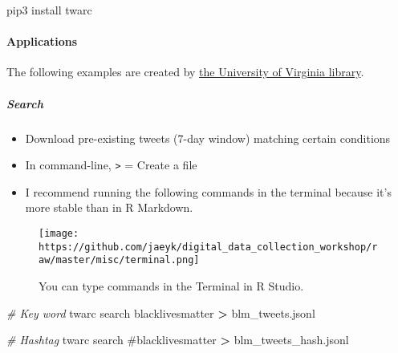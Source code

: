 \documentclass[
]{book}
\newenvironment{Shaded}{\begin{snugshade}}{\end{snugshade}}
\newcommand{\CommentTok}[1]{\textcolor[rgb]{0.56,0.35,0.01}{\textit{#1}}}
\newcommand{\ExtensionTok}[1]{#1}
\newcommand{\NormalTok}[1]{#1}
\newcommand{\OperatorTok}[1]{\textcolor[rgb]{0.81,0.36,0.00}{\textbf{#1}}}
\newcommand{\StringTok}[1]{\textcolor[rgb]{0.31,0.60,0.02}{#1}}
\begin{document}
\begin{Shaded}
\begin{Highlighting}[]
\ExtensionTok{pip3}\NormalTok{ install twarc}
\end{Highlighting}
\end{Shaded}

\hypertarget{applications-1}{%
\paragraph{Applications}\label{applications-1}}

The following examples are created by \href{http://digitalcollecting.lib.virginia.edu/toolkit/docs/social-media/twarc-commands/}{the University of Virginia library}.

\hypertarget{search}{%
\subparagraph{Search}\label{search}}

\begin{itemize}
\item
  Download pre-existing tweets (7-day window) matching certain conditions
\item
  In command-line, \texttt{\textgreater{}} = Create a file
\item
  I recommend running the following commands in the terminal because it's more stable than in R Markdown.
\end{itemize}

\begin{figure}
\centering
\texttt{[image: https://github.com/jaeyk/digital\_data\_collection\_workshop/raw/master/misc/terminal.png]}
\caption{You can type commands in the Terminal in R Studio.}
\end{figure}

\begin{Shaded}
\begin{Highlighting}[]
\CommentTok{\# Key word }
\ExtensionTok{twarc}\NormalTok{ search blacklivesmatter }\OperatorTok{\textgreater{}}\NormalTok{ blm\_tweets.jsonl}
\end{Highlighting}
\end{Shaded}

\begin{Shaded}
\begin{Highlighting}[]
\CommentTok{\# Hashtag }
\ExtensionTok{twarc}\NormalTok{ search }\StringTok{\textquotesingle{}\#blacklivesmatter\textquotesingle{}} \OperatorTok{\textgreater{}}\NormalTok{ blm\_tweets\_hash.jsonl}
\end{Highlighting}
\end{Shaded}
\end{document}
